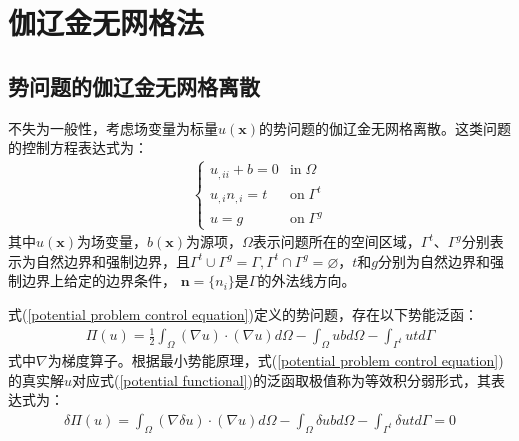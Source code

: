 \chapter{伽辽金无网格法}
\section{势问题的伽辽金无网格离散}
不失为一般性，考虑场变量为标量$u(\pmb{x})$的势问题的伽辽金无网格离散。这类问题的控制方程表达式为：
\begin{equation}\label{potential problem control equation}
\begin{split}
\begin{cases}
    u_{,ii}+b=0&\text{in}\;\Omega\\
    u_{,i}n_{,i}=t&\text{on}\;\Gamma^t\\
    u=g&\text{on}\;\Gamma^g
\end{cases}
\end{split}
\end{equation}
其中$u(\pmb{x})$为场变量，$b(\pmb{x})$为源项，$\Omega$表示问题所在的空间区域，$\Gamma^t\text{、}\Gamma^g$分别表示为自然边界和强制边界，且$\Gamma^t\cup \Gamma^g=\Gamma,\Gamma^t\cap \Gamma^g=\varnothing$，$t$和$g$分别为自然边界和强制边界上给定的边界条件，
$\pmb{n}=\{n_i\}$是$\Gamma$的外法线方向。\par
式(\ref{potential problem control equation})定义的势问题，存在以下势能泛函：
\begin{equation}\label{potential functional}
\begin{split}
    \Pi(u)=\frac{1}{2}\int_{\Omega}(\nabla u)\cdot(\nabla u)d\Omega-\int_{\Omega}ubd\Omega-\int_{\Gamma^t}utd\Gamma
\end{split}
\end{equation}
式中$\nabla$为梯度算子。根据最小势能原理，式(\ref{potential problem control equation})的真实解$u$对应式(\ref{potential functional})的泛函取极值称为等效积分弱形式，其表达式为：
\begin{equation}\label{weak form}
\begin{split}
    \delta \Pi(u)=\int_{\Omega}(\nabla \delta u)\cdot(\nabla u)d\Omega-\int_{\Omega}\delta ubd\Omega-\int_{\Gamma^t}\delta utd\Gamma=0
\end{split}
\end{equation}\par

